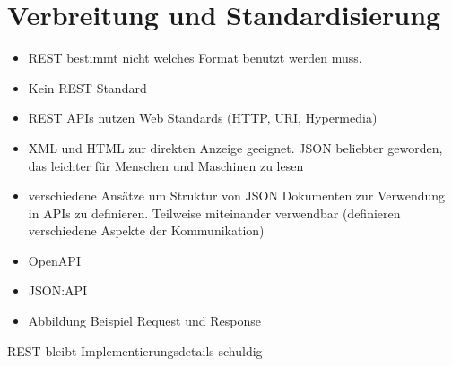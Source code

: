\section{Verbreitung und Standardisierung}
\begin{itemize}
  \item REST bestimmt nicht welches Format benutzt werden muss.
  \item Kein REST Standard
  \item REST APIs nutzen Web Standards (HTTP, URI, Hypermedia)
  \item XML und HTML zur direkten Anzeige geeignet. JSON beliebter geworden, das leichter für Menschen und Maschinen zu lesen
  \item verschiedene Ansätze um Struktur von JSON Dokumenten zur Verwendung in APIs zu definieren. Teilweise miteinander verwendbar (definieren verschiedene Aspekte der Kommunikation)
  \item OpenAPI
  \item JSON:API
  \item Abbildung Beispiel Request und Response
\end{itemize}
REST bleibt Implementierungsdetails schuldig\cite[vgl.][86]{REST}
